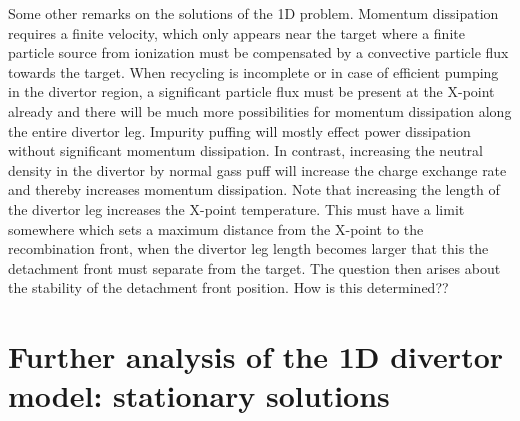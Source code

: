 \documentclass[amsmath,amssymb,a4]{revtex4-2}
\begin{document}
Some other remarks on the solutions of the 1D problem. Momentum dissipation requires a finite velocity, which only appears near the target where a finite particle source from ionization must be compensated by a convective particle flux towards the target. When recycling is incomplete or in case of efficient pumping in the divertor region, a significant particle flux must be present at the X-point already and there will be much more possibilities for momentum dissipation along the entire divertor leg. Impurity puffing will mostly effect power dissipation without significant momentum dissipation. In contrast, increasing the neutral density in the divertor by normal gass puff will increase the charge exchange rate and thereby increases momentum dissipation. Note that increasing the length of the divertor leg increases the X-point temperature. This must have a limit somewhere which sets a maximum distance from the X-point to the recombination front, when the divertor leg length becomes larger that this the detachment front must separate from the target. The question then arises about the stability of the detachment front position. How is this determined??


\section{Further analysis of the 1D divertor model: stationary solutions}
\end{document}
